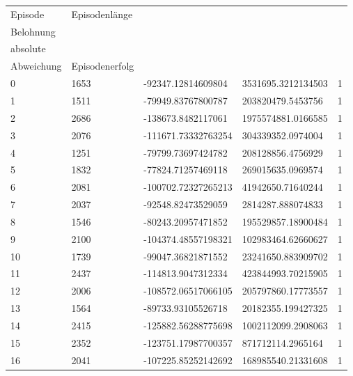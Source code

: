 \begin{longtable}{lllll}
    Episode & Episodenlänge & \begin{tabular}[c]{@{}l@{}}kumulierte \\ Belohnung\end{tabular} & \begin{tabular}[c]{@{}l@{}}quadrierte \\ absolute \\ Abweichung\end{tabular} & Episodenerfolg \\
    \endhead
    0 & 1653 & -92347.12814609804 & 3531695.3212134503 & 1 \\
    1 & 1511 & -79949.83767800787 & 203820479.5453756 & 1 \\
    2 & 2686 & -138673.8482117061 & 1975574881.0166585 & 1 \\
    3 & 2076 & -111671.73332763254 & 304339352.0974004 & 1 \\
    4 & 1251 & -79799.73697424782 & 208128856.4756929 & 1 \\
    5 & 1832 & -77824.71257469118 & 269015635.0969574 & 1 \\
    6 & 2081 & -100702.72327265213 & 41942650.71640244 & 1 \\
    7 & 2037 & -92548.82473529059 & 2814287.888074833 & 1 \\
    8 & 1546 & -80243.20957471852 & 195529857.18900484 & 1 \\
    9 & 2100 & -104374.48557198321 & 102983464.62660627 & 1 \\
    10 & 1739 & -99047.36821871552 & 23241650.883909702 & 1 \\
    11 & 2437 & -114813.9047312334 & 423844993.70215905 & 1 \\
    12 & 2006 & -108572.06517066105 & 205797860.17773557 & 1 \\
    13 & 1564 & -89733.93105526718 & 20182355.199427325 & 1 \\
    14 & 2415 & -125882.56288775698 & 1002112099.2908063 & 1 \\
    15 & 2352 & -123751.17987700357 & 871712114.2965164 & 1 \\
    16 & 2041 & -107225.85252142692 & 168985540.21331608 & 1 \\

\end{longtable}

